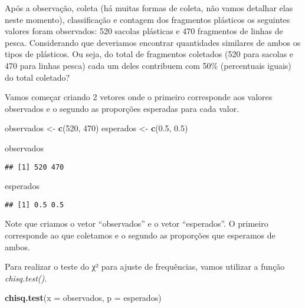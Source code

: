 \documentclass[]{book}
\newenvironment{Shaded}{\begin{snugshade}}{\end{snugshade}}
\newcommand{\DataTypeTok}[1]{\textcolor[rgb]{0.13,0.29,0.53}{#1}}
\newcommand{\DecValTok}[1]{\textcolor[rgb]{0.00,0.00,0.81}{#1}}
\newcommand{\FloatTok}[1]{\textcolor[rgb]{0.00,0.00,0.81}{#1}}
\newcommand{\KeywordTok}[1]{\textcolor[rgb]{0.13,0.29,0.53}{\textbf{#1}}}
\newcommand{\NormalTok}[1]{#1}
\newcommand{\StringTok}[1]{\textcolor[rgb]{0.31,0.60,0.02}{#1}}
\begin{document}
Após a observação, coleta (há muitas formas de coleta, não vamos detalhar elas neste momento), classificação e contagem dos fragmentos plásticos os seguintes valores foram observados: 520 sacolas plásticas e 470 fragmentos de linhas de pesca. Considerando que deveriamos encontrar quantidades similares de ambos os tipos de plásticos. Ou seja, do total de fragmentos coletados (520 para sacolas e 470 para linhas pesca) cada um deles contribuem com 50\% (percentuais iguais) do total coletado?

Vamos começar criando 2 vetores onde o primeiro corresponde aos valores observados e o segundo as proporções esperadas para cada valor.

\begin{Shaded}
\begin{Highlighting}[]
\NormalTok{observados <-}\StringTok{ }\KeywordTok{c}\NormalTok{(}\DecValTok{520}\NormalTok{, }\DecValTok{470}\NormalTok{)}
\NormalTok{esperados <-}\StringTok{ }\KeywordTok{c}\NormalTok{(}\FloatTok{0.5}\NormalTok{, }\FloatTok{0.5}\NormalTok{)}

\NormalTok{observados}
\end{Highlighting}
\end{Shaded}

\begin{verbatim}
## [1] 520 470
\end{verbatim}

\begin{Shaded}
\begin{Highlighting}[]
\NormalTok{esperados}
\end{Highlighting}
\end{Shaded}

\begin{verbatim}
## [1] 0.5 0.5
\end{verbatim}

Note que criamos o vetor ``observados'' e o vetor ``esperados''. O primeiro corresponde ao que coletamos e o segundo as proporções que esperamos de ambos.

Para realizar o teste do χ² para ajuste de frequências, vamos utilizar a função \emph{chisq.test()}.

\begin{Shaded}
\begin{Highlighting}[]
\KeywordTok{chisq.test}\NormalTok{(}\DataTypeTok{x =}\NormalTok{ observados, }\DataTypeTok{p =}\NormalTok{ esperados)}
\end{Highlighting}
\end{Shaded}
\end{document}
